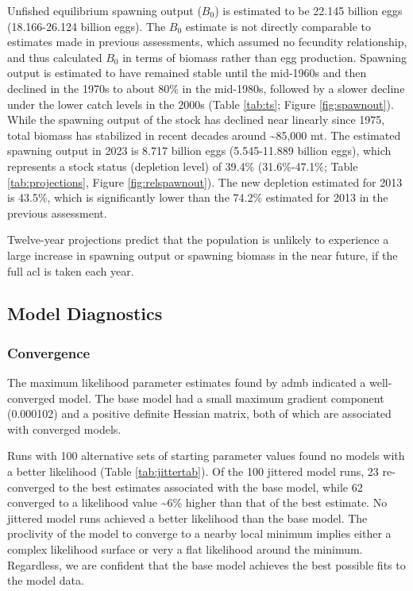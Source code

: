 \documentclass[11pt,
  letterpaper,
]{article}
\begin{document}
Unfished equilibrium spawning output (\(B_0\)) is estimated to be 22.145 billion eggs (18.166-26.124 billion eggs). The \(B_0\) estimate is not directly comparable to estimates made in previous assessments, which assumed no fecundity relationship, and thus calculated \(B_0\) in terms of biomass rather than egg production. Spawning output is estimated to have remained stable until the mid-1960s and then declined in the 1970s to about 80\% in the mid-1980s, followed by a slower decline under the lower catch levels in the 2000s (Table \ref{tab:ts}; Figure \ref{fig:spawnout}). While the spawning output of the stock has declined near linearly since 1975, total biomass has stabilized in recent decades around \textasciitilde85,000 mt. The estimated spawning output in 2023 is 8.717 billion eggs (5.545-11.889 billion eggs), which represents a stock status (depletion level) of 39.4\% (31.6\%-47.1\%; Table \ref{tab:projections}, Figure \ref{fig:relspawnout}). The new depletion estimated for 2013 is 43.5\%, which is significantly lower than the 74.2\% estimated for 2013 in the previous assessment.

Twelve-year projections predict that the population is unlikely to experience a large increase in spawning output or spawning biomass in the near future, if the full \gls{acl} is taken each year.

\hypertarget{model-diagnostics}{%
\subsection{Model Diagnostics}\label{model-diagnostics}}

\hypertarget{convergence}{%
\subsubsection{Convergence}\label{convergence}}

The maximum likelihood parameter estimates found by \gls{admb} indicated a well-converged model. The base model had a small maximum gradient component (0.000102) and a positive definite Hessian matrix, both of which are associated with converged models.

Runs with 100 alternative sets of starting parameter values found no models with a better likelihood (Table \ref{tab:jittertab}). Of the 100 jittered model runs, 23 re-converged to the best estimates associated with the base model, while 62 converged to a likelihood value \textasciitilde6\% higher than that of the best estimate. No jittered model runs achieved a better likelihood than the base model. The proclivity of the model to converge to a nearby local minimum implies either a complex likelihood surface or very a flat likelihood around the minimum. Regardless, we are confident that the base model achieves the best possible fits to the model data.
\end{document}

